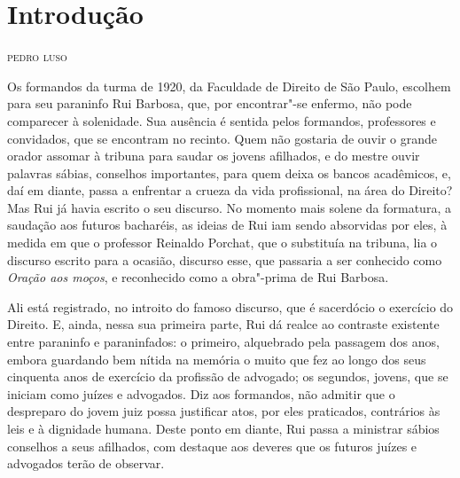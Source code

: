 \chapter[Introdução, \emph{por Pedro Luso}]{Introdução}

\begin{flushright}
\textsc{pedro luso}
\end{flushright}

\noindent{}Os formandos da turma de 1920, da Faculdade de Direito de São Paulo,
escolhem para seu paraninfo Rui Barbosa, que, por encontrar"-se enfermo,
não pode comparecer à solenidade. Sua ausência é sentida
pelos formandos, professores e convidados, que se encontram no recinto.
Quem não gostaria de ouvir o grande orador assomar à tribuna para
saudar os jovens afilhados, e do mestre ouvir palavras sábias,
conselhos importantes, para quem deixa os bancos acadêmicos, e, daí em
diante, passa a enfrentar a crueza da vida profissional, na área do
Direito? Mas Rui já havia escrito o seu discurso. No momento mais
solene da formatura, a saudação aos futuros bacharéis, as ideias de Rui
iam sendo absorvidas por eles, à medida em que o professor Reinaldo
Porchat, que o substituía na tribuna, lia o discurso escrito para a
ocasião, discurso esse, que passaria a ser conhecido como \textit{Oração aos
moços}, e reconhecido como a obra"-prima de Rui Barbosa. 

Ali está registrado, no introito do
famoso discurso, que é sacerdócio o exercício do Direito. E, ainda,
nessa sua primeira parte, Rui dá realce ao contraste existente entre
paraninfo e paraninfados: o primeiro, alquebrado pela passagem dos
anos, embora guardando bem nítida na memória o muito que fez ao longo
dos seus cinquenta anos de exercício da profissão de advogado; os
segundos, jovens, que se iniciam como juízes e advogados. Diz aos
formandos, não admitir que o despreparo do jovem juiz possa justificar
atos, por eles praticados, contrários às leis e à dignidade humana.
Deste ponto em diante, Rui passa a ministrar
sábios conselhos a seus afilhados, com destaque aos deveres que os
futuros juízes e advogados terão de observar. 

